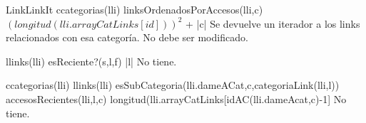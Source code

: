 \begin{interfaz}{LinkLinkIt}
{c\in categorias(lli)}
{\igres linksOrdenadosPorAccesos(lli,c)}
{$(longitud(lli.arrayCatLinks[id]))^2$ + |c|}
{Se devuelve un iterador a los links relacionados con esa categoría. No debe ser modificado.}

{l\in links(lli)}
{\igres esReciente?(s,l,f)}
{|l|}
{No tiene.}

{c\in categorias(lli) \land l\in links(lli) \land esSubCategoria(lli.dameACat,c,categoriaLink(lli,l))}
{\igres accesosRecientes(lli,l,c)}
{longitud(lli.arrayCatLinks[idAC(lli.dameAcat,c)-1]}
{No tiene.}






\end{interfaz}
